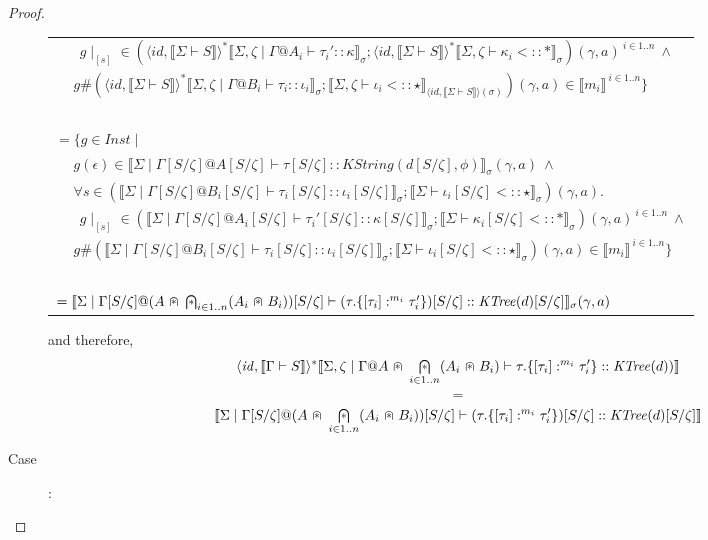 \documentclass{article}
\newcommand{\sem}[1]{\llbracket #1 \rrbracket}
\newcommand{\capdot}{~\stackinset{c}{}{c}{}{\scalebox{0.8}{$\ast$}}{$\cap$}~}
\newcommand{\bigcapdot}{\mathop{\stackinset{c}{}{c}{}{\scalebox{0.8}{$\ast$}}{$\bigcap$}}}
\begin{document}
\begin{proof}
\begin{description}
\begin{center}
\begin{tabular}{l}
$~~~~~~~~g \! \mid_{[s]} \in (\langle \mathit{id}, \sem{\Sigma \vdash S} \rangle^* \sem{\Sigma,\zeta \mid \Gamma @ A_i \vdash \tau_i' :: \kappa}_{\sigma};\langle \mathit{id}, \sem{\Sigma \vdash S} \rangle^* \sem{\Sigma,\zeta \vdash \kappa_i <:: \ast}_{\sigma})(\gamma,a)^{~i \in 1..n}~\wedge$\\
$~~~~~~g \# (\langle \mathit{id}, \sem{\Sigma \vdash S} \rangle^* \sem{\Sigma,\zeta \mid \Gamma @ B_i \vdash \tau_i :: \iota_i}_{\sigma};\sem{\Sigma,\zeta \vdash \iota_i <:: \star}_{\langle \mathit{id}, \sem{\Sigma \vdash S} \rangle(\sigma)})(\gamma,a) \in \sem{m_i}^{~i \in 1..n} \}$ \\~\\
$= \{ g \in \mathit{Inst} \mid$ \\
$~~~~~~g(\epsilon) \in \sem{\Sigma \mid \Gamma[S/\zeta] @ A[S/\zeta] \vdash \tau[S/\zeta] :: \mathit{KString(d[S/\zeta],\phi)}}_{\sigma}(\gamma,a)~\wedge$ \\
$~~~~~~\forall s \in (\sem{\Sigma \mid \Gamma[S/\zeta] @ B_i[S/\zeta] \vdash \tau_i[S/\zeta] :: \iota_i[S/\zeta]}_{\sigma};\sem{\Sigma \vdash \iota_i[S/\zeta] <:: \star}_{\sigma})(\gamma,a).$\\
$~~~~~~~~g \! \mid_{[s]} \in (\sem{\Sigma \mid \Gamma[S/\zeta] @ A_i[S/\zeta] \vdash \tau_i'[S/\zeta] :: \kappa[S/\zeta]}_{\sigma};\sem{\Sigma \vdash \kappa_i[S/\zeta] <:: \ast}_{\sigma})(\gamma,a)^{~i \in 1..n}~\wedge$\\
$~~~~~~g \# (\sem{\Sigma \mid \Gamma[S/\zeta] @ B_i[S/\zeta] \vdash \tau_i[S/\zeta] :: \iota_i[S/\zeta]}_{\sigma};\sem{\Sigma \vdash \iota_i[S/\zeta] <:: \star}_{\sigma})(\gamma,a) \in \sem{m_i}^{~i \in 1..n} \}$\\~\\
$= \sem{\Sigma \mid \Gamma[S/\zeta] @ (A \capdot \bigcapdot_{i \in 1..n} (A_i \capdot B_i))[S/\zeta] \vdash (\tau.\{ [\tau_i] :^{m_i} \tau'_i \})[S/\zeta] :: \mathit{KTree}(d)[S/\zeta]  }_{\sigma}(\gamma,a)  $
\end{tabular}
\end{center}
and therefore,
$$\langle \mathit{id}, \sem{\Gamma \vdash S} \rangle^* \sem{\Sigma,\zeta \mid \Gamma @ A \capdot \bigcapdot_{i \in 1..n} (A_i \capdot B_i) \vdash \tau.\{ [\tau_i] :^{m_i} \tau_i' \} :: \mathit{KTree}(d))}$$ $$=$$ $$\sem{\Sigma \mid \Gamma[S/\zeta] @ (A \capdot \bigcapdot_{i \in 1..n} (A_i \capdot B_i))[S/\zeta] \vdash (\tau.\{ [\tau_i] :^{m_i} \tau'_i \})[S/\zeta] :: \mathit{KTree}(d)[S/\zeta]}$$
\item[Case \sc{Path}]:~\\

\end{description}
\end{proof}
\end{document}
